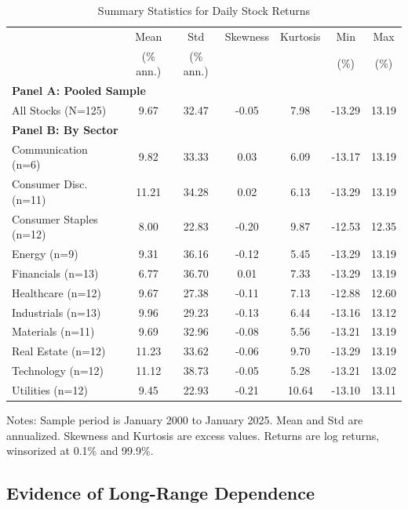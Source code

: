 \documentclass[12pt,a4paper]{article}
\begin{document}
\begin{table}[htbp]
\centering
\caption{Summary Statistics for Daily Stock Returns}
\label{tab:summary_stats}
\small
\begin{tabular}{lcccccc}
\toprule
 & Mean & Std & Skewness & Kurtosis & Min & Max \\
 & (\% ann.) & (\% ann.) & & & (\%) & (\%) \\
\midrule
\multicolumn{7}{l}{\textbf{Panel A: Pooled Sample}} \\
All Stocks (N=125) & 9.67 & 32.47 & -0.05 & 7.98 & -13.29 & 13.19 \\
\midrule
\multicolumn{7}{l}{\textbf{Panel B: By Sector}} \\
Communication (n=6) & 9.82 & 33.33 & 0.03 & 6.09 & -13.17 & 13.19 \\
Consumer Disc. (n=11) & 11.21 & 34.28 & 0.02 & 6.13 & -13.29 & 13.19 \\
Consumer Staples (n=12) & 8.00 & 22.83 & -0.20 & 9.87 & -12.53 & 12.35 \\
Energy (n=9) & 9.31 & 36.16 & -0.12 & 5.45 & -13.29 & 13.19 \\
Financials (n=13) & 6.77 & 36.70 & 0.01 & 7.33 & -13.29 & 13.19 \\
Healthcare (n=12) & 9.67 & 27.38 & -0.11 & 7.13 & -12.88 & 12.60 \\
Industrials (n=13) & 9.96 & 29.23 & -0.13 & 6.44 & -13.16 & 13.12 \\
Materials (n=11) & 9.69 & 32.96 & -0.08 & 5.56 & -13.21 & 13.19 \\
Real Estate (n=12) & 11.23 & 33.62 & -0.06 & 9.70 & -13.29 & 13.19 \\
Technology (n=12) & 11.12 & 38.73 & -0.05 & 5.28 & -13.21 & 13.02 \\
Utilities (n=12) & 9.45 & 22.93 & -0.21 & 10.64 & -13.10 & 13.11 \\
\bottomrule
\end{tabular}
\begin{tablenotes}\small
\item Notes: Sample period is January 2000 to January 2025. Mean and Std are annualized. Skewness and Kurtosis are excess values. Returns are log returns, winsorized at 0.1\% and 99.9\%.
\end{tablenotes}
\end{table}

\subsection{Evidence of Long-Range Dependence}
\end{document}
